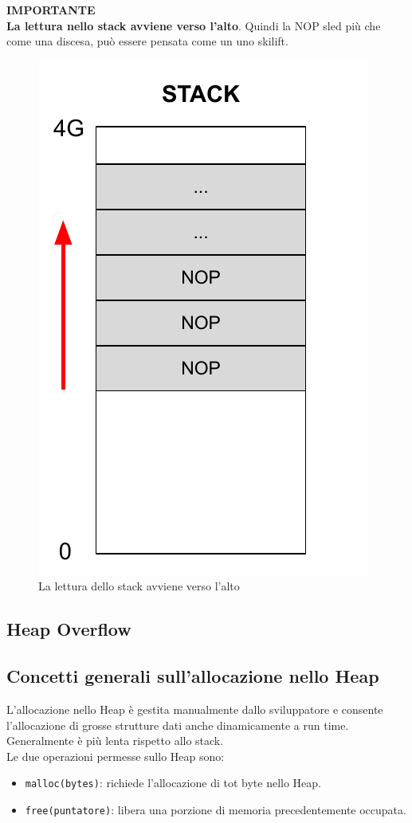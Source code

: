 \documentclass[a4paper,12pt]{article}
\begin{document}
\noindent\textbf{\Large IMPORTANTE}\\
 \textbf{La lettura nello stack avviene verso l'alto}. Quindi la NOP sled più che come una discesa, può essere pensata come un uno skilift.
 
\begin{figure}[H]
	\centering
	\includegraphics[width=0.4\linewidth]{Immagini/Stack6.pdf}
	\caption{La lettura dello stack avviene verso l'alto}
\end{figure}

\subsection{Heap Overflow}
\subsection{Concetti generali sull'allocazione nello Heap}
L'allocazione nello Heap è gestita manualmente dallo sviluppatore e consente l'allocazione di grosse strutture dati anche dinamicamente a run time. Generalmente è più lenta rispetto allo stack.\\
Le due operazioni permesse sullo Heap sono:
\begin{itemize}
\item \texttt{malloc(bytes)}: richiede l'allocazione di tot byte nello Heap.
\item \texttt{free(puntatore)}: libera una porzione di memoria precedentemente occupata.
\end{itemize}
\end{document}
